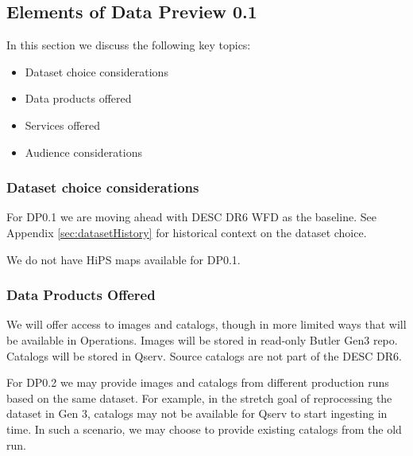 
\subsection{Elements of Data Preview 0.1} \label{sec:dp0.1}


In this section we discuss the following key topics:

\begin{itemize}

\item Dataset choice considerations

\item Data products offered

\item Services offered

\item Audience considerations

\end{itemize}

\subsubsection {Dataset choice considerations} \label{sec:dataset}

For DP0.1 we are moving ahead with DESC DR6 WFD as the baseline.
See Appendix \ref{sec:datasetHistory} for historical context on the dataset choice.


We do not have  HiPS maps available for DP0.1.



\subsubsection{Data Products Offered}

We will offer access to images and catalogs, though in more limited ways that will be available in Operations.
Images will be stored in read-only Butler Gen3 repo.
Catalogs will be stored in Qserv. Source catalogs are not part of the DESC DR6.

For DP0.2 we may provide images and catalogs from different production runs based on the same dataset.
For example, in the stretch goal of reprocessing the dataset in Gen 3, catalogs may not be available for Qserv to start ingesting in time. In such a scenario, we may choose to provide existing catalogs from the old run.

